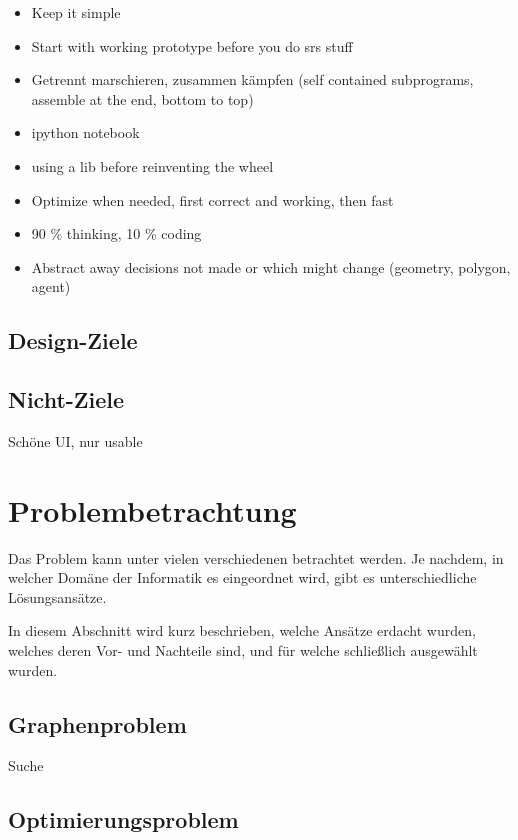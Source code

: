 \documentclass{article}
\begin{document}
\begin{itemize}
\item Keep it simple
\item Start with working prototype before you do srs stuff
\item Getrennt marschieren, zusammen kämpfen (self contained subprograms, assemble at the end, bottom to top)
\item ipython notebook
\item using a lib before reinventing the wheel
\item Optimize when needed, first correct and working, then fast
\item 90 \% thinking, 10 \% coding
\item Abstract away decisions not made or which might change (geometry, polygon, agent)
\end{itemize}

\subsection{Design-Ziele}

\subsection{Nicht-Ziele}

Schöne UI, nur usable

\clearpage
\section{Problembetrachtung}

Das Problem kann unter vielen verschiedenen betrachtet 
werden. Je nachdem, in welcher Domäne der Informatik
es eingeordnet wird, gibt es unterschiedliche Lösungsansätze.

In diesem Abschnitt wird kurz beschrieben, welche Ansätze
erdacht wurden, welches deren Vor- und Nachteile sind, und
für welche schließlich ausgewählt wurden.

\subsection{Graphenproblem}

Suche

\subsection{Optimierungsproblem}
\end{document}
